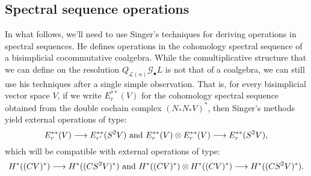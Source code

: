 \documentclass[11pt]{amsart}
\theoremstyle{plain}
\theoremstyle{definition}
\renewcommand{\to}{\longrightarrow}
\newcommand{\scrG}{\mathscr{G}}
\newcommand{\calL}{\mathcal{L}}
\theoremstyle{plain}
\newcommand{\BSWres}{{\scrG_\bullet}}
\begin{document}
\begin{Composite functor spectral sequences}
\subsection{Spectral sequence operations}
In what follows, we'll need to use Singer's techniques for deriving operations in spectral sequences. He defines operations in the cohomology spectral sequence of a bisimplicial cocommutative coalgebra. While the comultiplicative structure that we can define on the resolution $Q_{\calL(n)}\BSWres L$ is not that of a coalgebra, we can still use his techniques after a single simple observation. That is, for every bisimplicial vector space $V$, if we write $E_r^{**}(V)$ for the cohomology spectral sequence obtained from the double cochain complex $(N_*N_*V)^*$, then Singer's methods yield external operations of type:
\[E_r^{**}(V)\to E_{r'}^{**}(S^2V)\textup{ and }E_r^{**}(V)\otimes E_r^{**}(V)\to E_r^{**}(S^2V),\]
which will be compatible with external operations of type:
\[H^{*}((CV)^*)\to H^{*}((CS^2V)^*)\textup{ and }H^{*}((CV)^*)\otimes H^{*}((CV)^*)\to H^{*}((CS^2V)^*).\]


\end{Composite functor spectral sequences}
\end{document}
